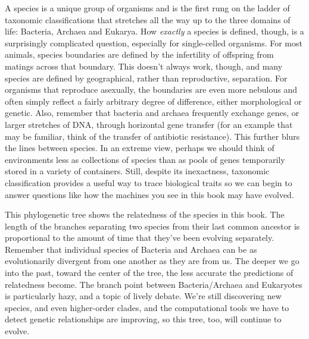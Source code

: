 \documentclass[]{tufte-book}
\begin{document}
A species is a unique group of organisms and is the first rung on the
ladder of taxonomic classifications that stretches all the way up to the
three domains of life: Bacteria, Archaea and Eukarya. How \emph{exactly}
a species is defined, though, is a surprisingly complicated question,
especially for single-celled organisms. For most animals, species
boundaries are defined by the infertility of offspring from matings
across that boundary. This doesn't always work, though, and many species
are defined by geographical, rather than reproductive, separation. For
organisms that reproduce asexually, the boundaries are even more
nebulous and often simply reflect a fairly arbitrary degree of
difference, either morphological or genetic. Also, remember that
bacteria and archaea frequently exchange genes, or larger stretches of
DNA, through horizontal gene transfer (for an example that may be
familiar, think of the transfer of antibiotic resistance). This further
blurs the lines between species. In an extreme view, perhaps we should
think of environments less as collections of species than as pools of
genes temporarily stored in a variety of containers. Still, despite its
inexactness, taxonomic classification provides a useful way to trace
biological traits so we can begin to answer questions like how the
machines you see in this book may have evolved.

This phylogenetic tree shows the relatedness of the species in this
book. The length of the branches separating two species from their last
common ancestor is proportional to the amount of time that they've been
evolving separately. Remember that individual species of Bacteria and
Archaea can be as evolutionarily divergent from one another as they are
from us. The deeper we go into the past, toward the center of the tree,
the less accurate the predictions of relatedness become. The branch
point between Bacteria/Archaea and Eukaryotes is particularly hazy, and
a topic of lively debate. We're still discovering new species, and even
higher-order clades, and the computational tools we have to detect
genetic relationships are improving, so this tree, too, will continue to
evolve.
\end{document}
